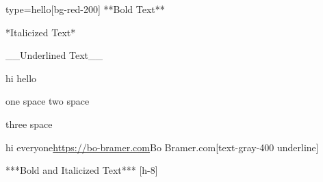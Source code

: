 \begin{Split}
    \begin{Card}{type=hello}[bg-red-200]
        **Bold Text**
    \end{Card}
    \begin{Card}
        *Italicized Text*
    \end{Card}
\end{Split}

\begin{Split}[mt-8]
    \begin{Card}[bg-green-200]
        __Underlined Text__

        hi
        hello

        one space
        two {space}

        three space

        hi everyone\url{https://bo-bramer.com}{Bo Bramer.com}[text-gray-400 underline]
    \end{Card}
    \begin{Card}[bg-purple-200]
        ***Bold and Italicized Text***
        [h-8]
    \end{Card}
\end{Split}